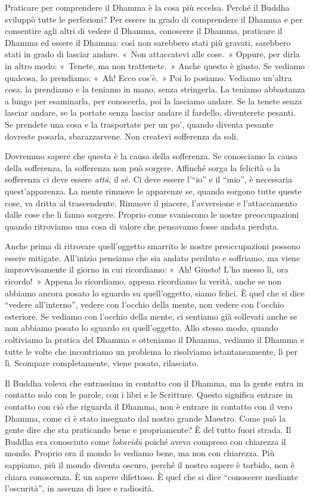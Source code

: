 Praticare per comprendere il Dhamma è la cosa più eccelsa. Perché il
Buddha sviluppò tutte le perfezioni? Per essere in grado di comprendere
il Dhamma e per consentire agli altri di vedere il Dhamma, conoscere il
Dhamma, praticare il Dhamma ed essere il Dhamma: così non sarebbero
stati più gravati, sarebbero stati in grado di lasciar andare. «~Non
attaccatevi alle cose.~» Oppure, per dirla in altro modo: «~Tenete, ma
non trattenete.~» Anche questo è giusto. Se vediamo qualcosa, lo
prendiamo: «~Ah! Ecco cos'è.~» Poi lo posiamo. Vediamo un'altra cosa, la
prendiamo e la teniamo in mano, senza stringerla. La teniamo abbastanza
a lungo per esaminarla, per conoscerla, poi la lasciamo andare. Se la
tenete senza lasciar andare, se la portate senza lasciar andare il
fardello, diventerete pesanti. Se prendete una cosa e la trasportate per
un po', quando diventa pesante dovreste posarla, sbarazzarvene. Non
createvi sofferenza da soli.

Dovremmo sapere che questa è la causa della sofferenza. Se conosciamo la
causa della sofferenza, la sofferenza non può sorgere. Affinché sorga la
felicità o la sofferenza ci deve essere \emph{attā}, il sé. Ci deve
essere l'``io'' e il ``mio'', è necessaria quest'apparenza. La mente
rimuove le apparenze se, quando sorgono tutte queste cose, va dritta al
trascendente. Rimuove il piacere, l'avversione e l'attaccamento dalle
cose che li fanno sorgere. Proprio come svaniscono le nostre
preoccupazioni quando ritroviamo una cosa di valore che pensavamo fosse
andata perduta.

Anche prima di ritrovare quell'oggetto smarrito le nostre preoccupazioni
possono essere mitigate. All'inizio pensiamo che sia andato perduto e
soffriamo, ma viene improvvisamente il giorno in cui ricordiamo: «~Ah!
Giusto! L'ho messo lì, ora ricordo!~» Appena lo ricordiamo, appena
ricordiamo la verità, anche se non abbiamo ancora posato lo sguardo su
quell'oggetto, siamo felici. È quel che si dice ``vedere all'interno'',
vedere con l'occhio della mente, non vedere con l'occhio esteriore. Se
vediamo con l'occhio della mente, ci sentiamo già sollevati anche se non
abbiamo posato lo sguardo su quell'oggetto. Allo stesso modo, quando
coltiviamo la pratica del Dhamma e otteniamo il Dhamma, vediamo il
Dhamma e tutte le volte che incontriamo un problema lo risolviamo
istantaneamente, lì per lì. Scompare completamente, viene posato,
rilasciato.

Il Buddha voleva che entrassimo in contatto con il Dhamma, ma la gente
entra in contatto solo con le parole, con i libri e le Scritture. Questo
significa entrare in contatto con ciò che riguarda il Dhamma, non è
entrare in contatto con il vero Dhamma, come ci è stato insegnato dal
nostro grande Maestro. Come può la gente dire che sta praticando bene e
propriamente? È del tutto fuori strada. Il Buddha era conosciuto come
\emph{lokavidū} poiché aveva compreso con chiarezza il mondo. Proprio
ora il mondo lo vediamo bene, ma non con chiarezza. Più sappiamo, più il
mondo diventa oscuro, perché il nostro sapere è torbido, non è chiara
conoscenza. È un sapere difettoso. È quel che si dice ``conoscere
mediante l'oscurità'', in assenza di luce e radiosità.

